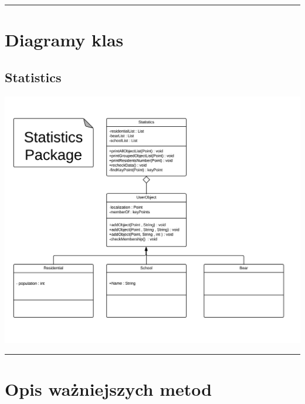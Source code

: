 \documentclass[a4paper,11pt]{article}
\newcommand{\linia}{\rule{\linewidth}{0.4mm}}
\begin{document}
\noindent\linia
\section{Diagramy klas}
\subsection{Statistics}
\includegraphics[scale=0.28]{statisticPackage.png} 

\noindent\linia
\section{Opis ważniejszych metod}
\end{document}
